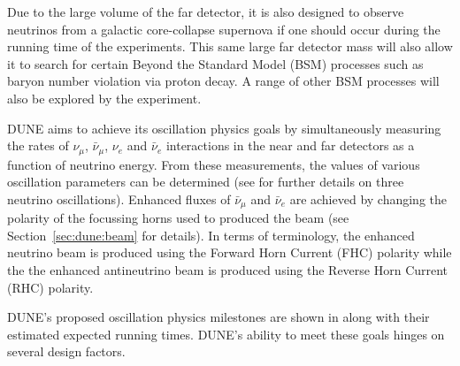 Due to the large volume of the far detector, it is also designed to observe neutrinos from a galactic core-collapse supernova if one should occur during the running time of the experiments.
This same large far detector mass will also allow it to search for certain Beyond the Standard Model (BSM) processes such as baryon number violation via proton decay.
A range of other BSM processes will also be explored by the experiment.

DUNE aims to achieve its oscillation physics goals by simultaneously measuring the rates of $\nu_{\mu}$, $\bar{\nu}_{\mu}$, $\nu_{e}$ and $\bar{\nu}_{e}$ interactions in the near and far detectors as a function of neutrino energy.
From these measurements, the values of various oscillation parameters can be determined (see  for further details on three neutrino oscillations). 
Enhanced fluxes of $\bar{\nu}_{\mu}$ and $\bar{\nu}_{e}$ are achieved by changing the polarity of the focussing horns used to produced the beam (see Section~\ref{sec:dune:beam} for details).
In terms of terminology, the enhanced neutrino beam is produced using the Forward Horn Current (FHC) polarity while the the enhanced antineutrino beam is produced using the Reverse Horn Current (RHC) polarity.

DUNE's proposed oscillation physics milestones are shown in  along with their estimated expected running times.
DUNE's ability to meet these goals hinges on several design factors.

